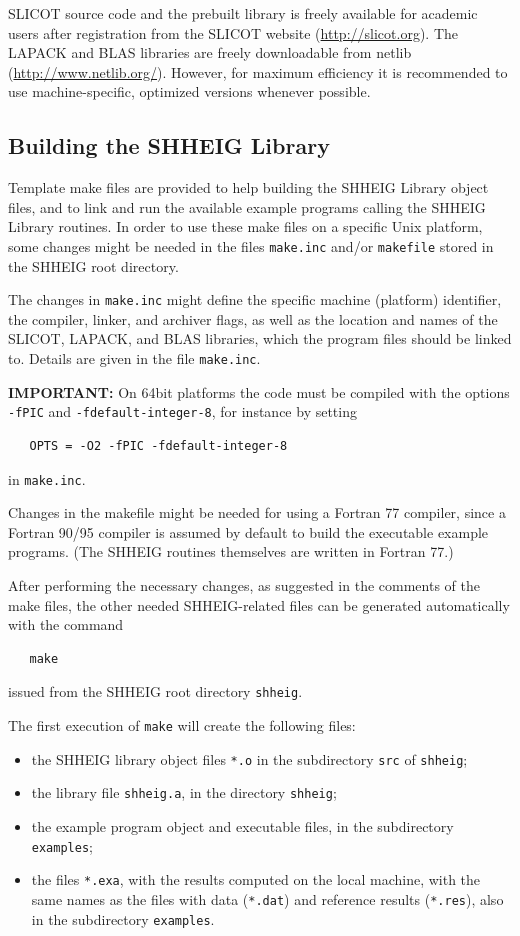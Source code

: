 \documentclass[a4paper,10pt]{article}
\begin{document}
SLICOT source code and the prebuilt library is freely available for academic users after registration from the SLICOT website (\url{http://slicot.org}). The LAPACK and BLAS libraries are freely downloadable from netlib (\url{http://www.netlib.org/}). However, for maximum efficiency it is recommended to use machine-specific, optimized versions whenever possible.
%
\subsection{Building the SHHEIG Library}
%
Template make files are provided to help building the SHHEIG Library object files, and to link and run the available example programs calling
the SHHEIG Library routines. In order to use these make files on a specific Unix platform, some changes might be needed in the files 
\texttt{make.inc} and/or \texttt{makefile} stored in the SHHEIG root directory.

The changes in \texttt{make.inc} might define the specific machine (platform) identifier, the compiler, linker, and archiver flags, as well as the location and names of the SLICOT, LAPACK, and BLAS libraries, which the program files should be linked to. Details are given in the file \texttt{make.inc}.

\textbf{IMPORTANT:} On 64bit platforms the code must be compiled with the options \texttt{-fPIC} and \texttt{-fdefault-integer-8}, for instance by setting
\begin{verbatim}
   OPTS = -O2 -fPIC -fdefault-integer-8
\end{verbatim}
in \texttt{make.inc}.

Changes in the makefile might be needed for using a Fortran 77 compiler, since a Fortran 90/95 compiler is assumed by default to build the
executable example programs. (The SHHEIG routines themselves are written in Fortran 77.)

After performing the necessary changes, as suggested in the comments of the make files, the other needed SHHEIG-related files can be generated
automatically with the command
\begin{verbatim}
   make
\end{verbatim}
issued from the SHHEIG root directory \texttt{shheig}.

The first execution of \texttt{make} will create the following files:
\begin{itemize}
 \item the SHHEIG library object files \texttt{*.o} in the subdirectory \texttt{src} of \texttt{shheig};
 \item the library file \texttt{shheig.a}, in the directory \texttt{shheig};
 \item the example program object and executable files, in the subdirectory \texttt{examples};
 \item the files \texttt{*.exa}, with the results computed on the local machine, with the same names as the files with data (\texttt{*.dat}) and reference results (\texttt{*.res}), also in the subdirectory \texttt{examples}.
\end{itemize}
  
\end{document}
